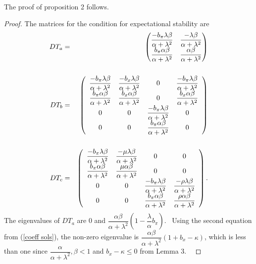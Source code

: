\documentclass{article}
\begin{document}
\begin{doublespace}
The proof of proposition 2 follows.

\begin{proof}
The matrices for the condition for expectational stability are%
\begin{eqnarray*}
DT_{a} &=&%
\begin{pmatrix}
\dfrac{-b_{\pi }\lambda \beta }{\alpha +\lambda ^{2}} & \dfrac{-\lambda 
\beta }{\alpha +\lambda ^{2}} \\ 
\dfrac{b_{\pi }\alpha \beta }{\alpha +\lambda ^{2}} & \dfrac{\alpha \beta }{%
\alpha +\lambda ^{2}}%
\end{pmatrix}
\\
&& \\
DT_{b} &=&\left( 
\begin{array}{cccc}
\dfrac{-b_{\pi }\lambda \beta }{\alpha +\lambda ^{2}} & \dfrac{-b_{x}\lambda
\beta }{\alpha +\lambda ^{2}} & 0 & \dfrac{-b_{\pi }\lambda \beta }{\alpha 
+\lambda ^{2}} \\ 
\dfrac{b_{\pi }\alpha \beta }{\alpha +\lambda ^{2}} & \dfrac{b_{x}\alpha 
\beta }{\alpha +\lambda ^{2}} & 0 & \dfrac{b_{x}\alpha \beta }{\alpha 
+\lambda ^{2}} \\ 
0 & 0 & \dfrac{-b_{\pi }\lambda \beta }{\alpha +\lambda ^{2}} & 0 \\ 
0 & 0 & \dfrac{b_{\pi }\alpha \beta }{\alpha +\lambda ^{2}} & 0%
\end{array}%
\right) \\
&& \\
DT_{c} &=&\left( 
\begin{array}{cccc}
\dfrac{-b_{\pi }\lambda \beta }{\alpha +\lambda ^{2}} & \dfrac{-\mu \lambda
\beta }{\alpha +\lambda ^{2}} & 0 & 0 \\ 
\dfrac{b_{\pi }\alpha \beta }{\alpha +\lambda ^{2}} & \dfrac{\mu \alpha 
\beta }{\alpha +\lambda ^{2}} & 0 & 0 \\ 
0 & 0 & \dfrac{-b_{\pi }\lambda \beta }{\alpha +\lambda ^{2}} & \dfrac{-\rho 
\lambda \beta }{\alpha +\lambda ^{2}} \\ 
0 & 0 & \dfrac{b_{\pi }\alpha \beta }{\alpha +\lambda ^{2}} & \dfrac{\rho 
\alpha \beta }{\alpha +\lambda ^{2}}%
\end{array}%
\right) .
\end{eqnarray*}%
The eigenvalues of $DT_{a}$ are 0 and $\dfrac{\alpha \beta }{\alpha +\lambda 
^{2}}\left( 1-\dfrac{\lambda }{\alpha }b_{\pi }\right) $. \ Using the second
equation from (\ref{coeff sols}), the non-zero eigenvalue is $\dfrac{\alpha 
\beta }{\alpha +\lambda ^{2}}\left( 1+b_{x}-\kappa \right) $, which is less
than one since $\dfrac{\alpha }{\alpha +\lambda ^{2}},\beta <1$ and $%
b_{x}-\kappa \leq 0$ from Lemma 3. \ 


\end{proof}
\end{doublespace}
\end{document}
